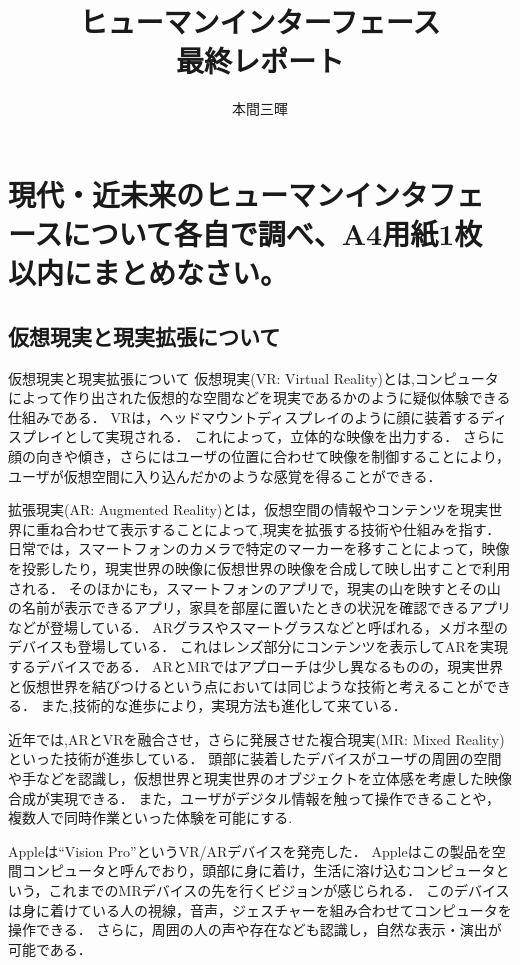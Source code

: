 \documentclass[titlepage,a4paper]{jsarticle}
\title{ヒューマンインターフェース\\最終レポート}
\author{本間三暉}
\begin{document}
\maketitle
\section{現代・近未来のヒューマンインタフェースについて各自で調べ、A4用紙1枚 以内にまとめなさい。}%
\subsection*{仮想現実と現実拡張について}
仮想現実と現実拡張について
仮想現実(VR: Virtual Reality)とは\cite{VR},コンピュータによって作り出された仮想的な空間などを現実であるかのように疑似体験できる仕組みである．
VRは，ヘッドマウントディスプレイのように顔に装着するディスプレイとして実現される．
これによって，立体的な映像を出力する．
さらに顔の向きや傾き，さらにはユーザの位置に合わせて映像を制御することにより，ユーザが仮想空間に入り込んだかのような感覚を得ることができる．

拡張現実(AR: Augmented Reality)とは\cite{AR}，仮想空間の情報やコンテンツを現実世界に重ね合わせて表示することによって,現実を拡張する技術や仕組みを指す．
日常では，スマートフォンのカメラで特定のマーカーを移すことによって，映像を投影したり，現実世界の映像に仮想世界の映像を合成して映し出すことで利用される．
そのほかにも，スマートフォンのアプリで，現実の山を映すとその山の名前が表示できるアプリ，家具を部屋に置いたときの状況を確認できるアプリなどが登場している．
ARグラスやスマートグラスなどと呼ばれる，メガネ型のデバイスも登場している．
これはレンズ部分にコンテンツを表示してARを実現するデバイスである．
ARとMRではアプローチは少し異なるものの，現実世界と仮想世界を結びつけるという点においては同じような技術と考えることができる．
また,技術的な進歩により，実現方法も進化して来ている．

近年では,ARとVRを融合させ，さらに発展させた複合現実(MR: Mixed Reality)\cite{MR}といった技術が進歩している．
頭部に装着したデバイスがユーザの周囲の空間や手などを認識し，仮想世界と現実世界のオブジェクトを立体感を考慮した映像合成が実現できる．
また，ユーザがデジタル情報を触って操作できることや，複数人で同時作業といった体験を可能にする.

Appleは``Vision Pro''というVR/ARデバイスを発売した．
Appleはこの製品を空間コンピュータと呼んでおり，頭部に身に着け，生活に溶け込むコンピュータという，これまでのMRデバイスの先を行くビジョンが感じられる．
このデバイスは身に着けている人の視線，音声，ジェスチャーを組み合わせてコンピュータを操作できる．
さらに，周囲の人の声や存在なども認識し，自然な表示・演出が可能である．
\end{document}
